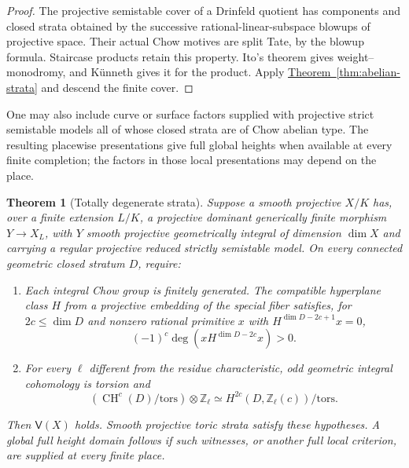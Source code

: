 \documentclass[11pt,a4paper]{article}
\newtheorem{theorem}{Theorem}[section]
\theoremstyle{definition}
\theoremstyle{remark}\newtheorem{remark}[theorem]{Remark}
\numberwithin{equation}{section}
\newcommand{\Z}{\mathbb Z}
\newcommand{\CH}{\operatorname{CH}}\newcommand{\an}{\mathrm{an}}
\newcommand{\thmref}[1]{\hyperref[#1]{\textcolor{resultlink}{Theorem~\ref*{#1}}}}
\begin{document}
\begin{proof}
The projective semistable cover of a Drinfeld quotient has
components and closed strata obtained by the successive
rational-linear-subspace blowups of projective space. Their actual
Chow motives are split Tate, by the blowup formula. Staircase
products retain this property. Ito's theorem \cite{Ito} gives
weight--monodromy, and K\"unneth gives it for the product. Apply
\thmref{thm:abelian-strata} and descend the finite cover.
\end{proof}

One may also include curve or surface factors supplied with
projective strict semistable models all of whose closed strata are
of Chow abelian type. The resulting placewise presentations give
full global heights when available at every finite completion;
the factors in those local presentations may depend on the place.

\begin{theorem}[Totally degenerate strata]\label{thm:totally-degenerate}
Suppose a smooth projective $X/K$ has, over a finite extension
$L/K$, a projective dominant generically finite morphism
$Y\to X_L$, with $Y$ smooth projective geometrically integral
of dimension $\dim X$ and carrying a regular projective reduced
strictly semistable model. On every
connected geometric closed stratum $D$, require:
\begin{enumerate}[label=\textup{(\roman*)}]
\item Each integral Chow group is finitely generated. The compatible
hyperplane class $H$ from a projective embedding of the special
fiber satisfies, for $2c\leq\dim D$ and nonzero rational primitive
$x$ with $H^{\dim D-2c+1}x=0$,
\[
 (-1)^c\deg(xH^{\dim D-2c}x)>0.
\]
\item For every $\ell$ different from the residue characteristic,
odd geometric integral cohomology is torsion and
\[
 (\CH^c(D)/\mathrm{tors})\otimes\Z_\ell
 \simeq H^{2c}(D,\Z_\ell(c))/\mathrm{tors}.
\]
\end{enumerate}
Then $\mathsf V(X)$ holds. Smooth projective toric strata satisfy
these hypotheses. A global full height domain follows if such
witnesses, or another full local criterion, are supplied at every
finite place.
\end{theorem}
\end{document}
